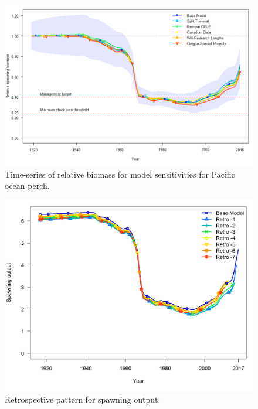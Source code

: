 \documentclass[12pt,]{article}
\begin{document}
\begin{figure}
\centering
\includegraphics{Figures/depl_sens2.png}
\caption{Time-series of relative biomass for model sensitivities for
Pacific ocean perch. \label{fig:sens2_depl}}
\end{figure}

\FloatBarrier

\begin{figure}
\centering
\includegraphics{Figures/compare1_spawnbio.png}
\caption{Retrospective pattern for spawning output.
\label{fig:retro_sb}}
\end{figure}

\FloatBarrier
\end{document}
